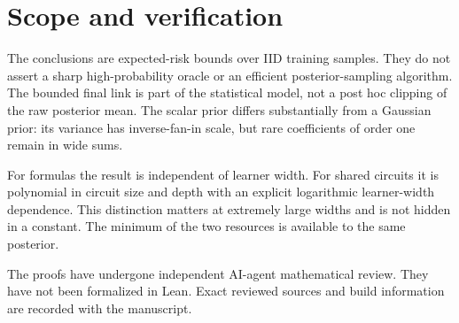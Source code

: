 \documentclass[11pt]{article}
\begin{document}










\section{Scope and verification}
The conclusions are expected-risk bounds over IID training samples. They do not assert a sharp high-probability oracle or an efficient posterior-sampling algorithm. The bounded final link is part of the statistical model, not a post hoc clipping of the raw posterior mean. The scalar prior differs substantially from a Gaussian prior: its variance has inverse-fan-in scale, but rare coefficients of order one remain in wide sums.

For formulas the result is independent of learner width. For shared circuits it is polynomial in circuit size and depth with an explicit logarithmic learner-width dependence. This distinction matters at extremely large widths and is not hidden in a constant. The minimum of the two resources is available to the same posterior.

The proofs have undergone independent AI-agent mathematical review. They have not been formalized in Lean. Exact reviewed sources and build information are recorded with the manuscript.
\end{document}
